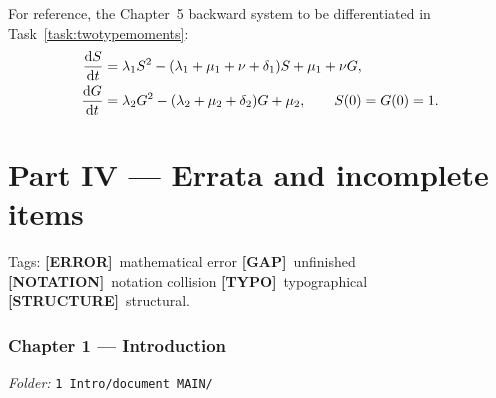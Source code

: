 \documentclass[11pt]{article}
\newcommand{\dd}{{\rm d}}
\newcommand{\ddt}[1]{\frac{\dd #1}{\dd t}}
\theoremstyle{plain}
\theoremstyle{definition}
\theoremstyle{remark}
\newcommand{\ERR}{\textcolor{red!70!black}{\textbf{[ERROR]}}}
\newcommand{\GAP}{\textcolor{orange!80!black}{\textbf{[GAP]}}}
\newcommand{\NOT}{\textcolor{blue!60!black}{\textbf{[NOTATION]}}}
\newcommand{\TYP}{\textcolor{gray!80!black}{\textbf{[TYPO]}}}
\newcommand{\STR}{\textcolor{purple!70!black}{\textbf{[STRUCTURE]}}}
\begin{document}
For reference, the Chapter~5 backward system to be differentiated in
Task~\ref{task:twotypemoments}:
\begin{align}
\ddt{S}&=\lambda_1S^2-(\lambda_1+\mu_1+\nu+\delta_1)S+\mu_1+\nu G,\label{eq:S-two}\\
\ddt{G}&=\lambda_2G^2-(\lambda_2+\mu_2+\delta_2)G+\mu_2,\qquad S(0)=G(0)=1.
\end{align}

\part*{Part IV --- Errata and incomplete items}

Tags: \ERR\ mathematical error \quad \GAP\ unfinished \quad \NOT\ notation collision
\quad \TYP\ typographical \quad \STR\ structural.

\section{Chapter 1 --- Introduction}
\emph{Folder:} \texttt{1 Intro/document MAIN/}
\end{document}
